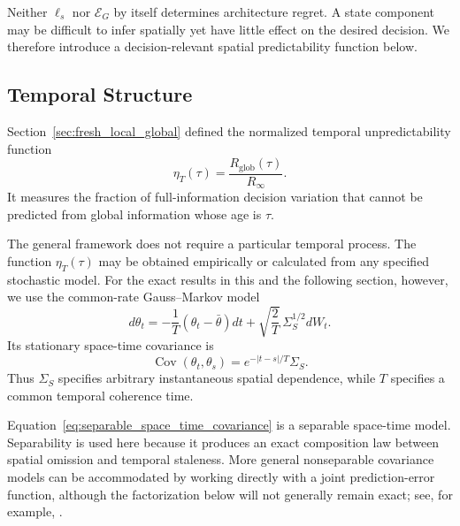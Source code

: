 \documentclass[11pt]{article}
\begin{document}
Neither $\ell_s$ nor $\mathcal{E}_G$ by itself determines architecture
regret. A state component may be difficult to infer spatially yet have little
effect on the desired decision. We therefore introduce a
decision-relevant spatial predictability function below.

\subsection{Temporal Structure}
\label{subsec:temporal_structure}

Section~\ref{sec:fresh_local_global} defined the normalized temporal
unpredictability function
\begin{equation}
    \eta_T(\tau)
    =
    \frac{
        R_{\mathrm{glob}}(\tau)
    }{
        R_\infty
    }.
    \label{eq:eta_T_recalled}
\end{equation}
It measures the fraction of full-information decision variation that cannot
be predicted from global information whose age is $\tau$.

The general framework does not require a particular temporal process. The
function $\eta_T(\tau)$ may be obtained empirically or calculated from any
specified stochastic model. For the exact results in this and the following
section, however, we use the common-rate Gauss--Markov model
\begin{equation}
    d\theta_t
    =
    -\frac{1}{T}
    \left(
        \theta_t-\bar{\theta}
    \right)dt
    +
    \sqrt{\frac{2}{T}}\,
    \Sigma_S^{1/2}dW_t.
    \label{eq:spatiotemporal_OU}
\end{equation}
Its stationary space-time covariance is
\begin{equation}
    \operatorname{Cov}
    \left(
        \theta_t,
        \theta_s
    \right)
    =
    e^{-|t-s|/T}\Sigma_S.
    \label{eq:separable_space_time_covariance}
\end{equation}
Thus $\Sigma_S$ specifies arbitrary instantaneous spatial dependence, while
$T$ specifies a common temporal coherence time.

Equation~\eqref{eq:separable_space_time_covariance} is a separable
space-time model. Separability is used here because it produces an exact
composition law between spatial omission and temporal staleness. More general
nonseparable covariance models can be accommodated by working directly with a
joint prediction-error function, although the factorization below will not
generally remain exact; see, for example,
\cite{gneiting2002nonseparable}.
\end{document}
